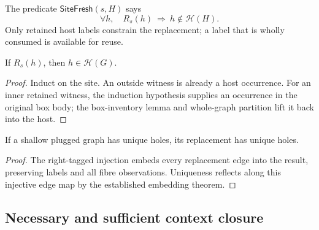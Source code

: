 \begin{definition}\label{term:site-fresh}
The predicate $\mathsf{SiteFresh}(s,H)$ says
\[
 \forall h,\quad R_s(h)\ \Longrightarrow\ h\notin\mathcal H(H).
\]
Only retained host labels constrain the replacement; a label that is wholly
consumed is available for reuse.
\end{definition}

\begin{lemma}
If $R_s(h)$, then $h\in\mathcal H(G)$.
\end{lemma}
\begin{proof}
Induct on the site. An outside witness is already a host occurrence. For an
inner retained witness, the induction hypothesis supplies an occurrence in the
original box body; the box-inventory lemma and whole-graph partition lift it
back into the host.
\end{proof}

\begin{lemma}
If a shallow plugged graph has unique holes, its replacement has unique holes.
\end{lemma}
\begin{proof}
The right-tagged injection embeds every replacement edge into the result,
preserving labels and all fibre observations. Uniqueness reflects along this
injective edge map by the established embedding theorem.
\end{proof}

\subsection{Necessary and sufficient context closure}

